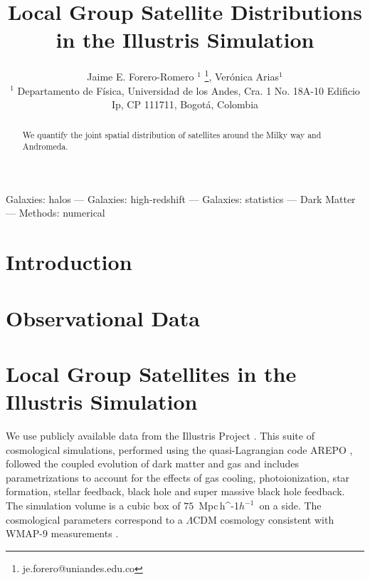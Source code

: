 \documentclass[a4paper,fleqn,usenatbib]{mnras}
\newcommand{\Mpch}{\,{\rm Mpc}\,\ifmmode h^{-1}\else $h^{-1}$\fi}
\begin{document}
\title[Satellites in the MW and M31]{Local Group Satellite Distributions in
 the Illustris Simulation}
\author[J.E. Forero-Romero \& V. Arias]
{Jaime E. Forero-Romero $^{1}$ \thanks{je.forero@uniandes.edu.co},
Ver\'onica Arias$^1$\\
$^1$ Departamento de F\'isica, Universidad de los Andes, Cra. 1
  No. 18A-10 Edificio Ip, CP 111711, Bogot\'a, Colombia \\
}

\maketitle

\begin{abstract}
We quantify the joint spatial distribution of satellites around the Milky way and Andromeda.
\end{abstract}

\begin{keywords}Galaxies: halos --- Galaxies: high-redshift --- Galaxies: statistics
--- Dark Matter --- Methods: numerical 
\end{keywords}

\section{Introduction}

\section{Observational Data}
\label{sec:obs}


\section{Local Group Satellites in the Illustris Simulation}
\label{sec:NumericalSetup}

We use publicly available data from the Illustris Project 
\citep{2014MNRAS.444.1518V}. 
This suite of cosmological simulations, performed using the quasi-Lagrangian
code AREPO \citep{2010MNRAS.401..791S}, followed the coupled evolution of dark 
matter and gas and includes parametrizations to account for the effects of
gas cooling, photoionization, star formation, stellar feedback, black
hole and super massive black hole feedback. 
The simulation volume is a cubic box of $75$ \Mpch\ on a side.
The cosmological parameters correspond to a $\Lambda$CDM cosmology
consistent with WMAP-9 measurements \citep{2013ApJS..208...19H}. 
\end{document}
